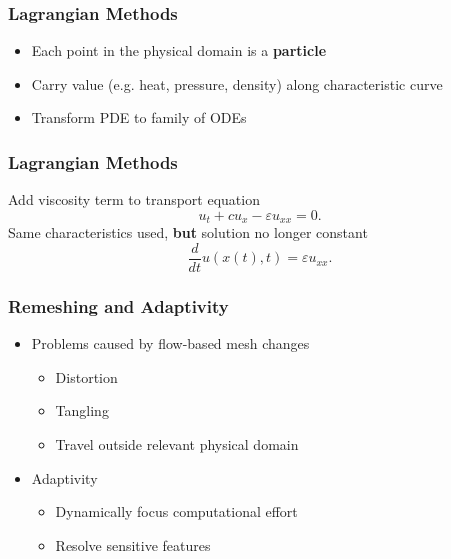 \documentclass{beamer}
\newcommand{\eps}{\varepsilon}
\begin{document}
\begin{frame}
\frametitle{Lagrangian Methods}
\begin{itemize}
\pause
\item Each point in the physical domain is a \textbf{particle}
\pause
\item Carry value (e.g. heat, pressure, density) along characteristic curve
\pause
\item Transform PDE to family of ODEs
\end{itemize}
\end{frame}

\begin{frame}
\frametitle{Lagrangian Methods}
\pause
Add viscosity term to transport equation
\begin{equation*}
u_t + c u_x - \eps u_{xx} = 0.
\end{equation*}
\pause
Same characteristics used, \textbf{but} solution no
longer constant
\pause
\begin{equation*}
\frac{d}{dt} u(x(t), t) = \eps u_{xx}.
\end{equation*}
\end{frame}

\begin{frame}
\frametitle{Remeshing and Adaptivity}
\begin{itemize}
\item Problems caused by flow-based mesh changes
\begin{itemize}
\pause
\item Distortion
\pause
\item Tangling
\pause
\item Travel outside relevant physical domain
\end{itemize}
\pause
\item Adaptivity
\begin{itemize}
\pause
\item Dynamically focus computational effort
\pause
\item Resolve sensitive features
\end{itemize}
\end{itemize}
\end{frame}
\end{document}
